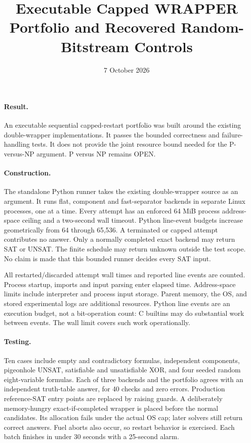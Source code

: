 \documentclass[11pt]{article}
\title{Executable Capped WRAPPER Portfolio and Recovered Random-Bitstream Controls}
\date{7 October 2026}
\begin{document}
\maketitle
\paragraph{Result.} An executable sequential capped-restart portfolio was built
around the existing double-wrapper implementations. It passes the bounded
correctness and failure-handling tests. It does not provide the joint resource
bound needed for the P-versus-NP argument. P versus NP remains OPEN.

\paragraph{Construction.} The standalone Python runner takes the existing
double-wrapper source as an argument. It runs flat, component and fast-separator
backends in separate Linux processes, one at a time. Every attempt has an enforced
64 MiB process address-space ceiling and a two-second wall timeout. Python
line-event budgets increase geometrically from 64 through 65,536. A terminated
or capped attempt contributes no answer. Only a normally completed exact backend
may return SAT or UNSAT. The finite schedule may return unknown outside the test
scope. No claim is made that this bounded runner decides every SAT input.

All restarted/discarded attempt wall times and reported line events are counted.
Process startup, imports and input parsing enter elapsed time. Address-space
limits include interpreter and process input storage. Parent memory, the OS,
and stored experimental logs are additional resources. Python line events are
an execution budget, not a bit-operation count: C builtins may do substantial
work between events. The wall limit covers such work operationally.

\paragraph{Testing.} Ten cases include empty and contradictory formulas,
independent components, pigeonhole UNSAT, satisfiable and unsatisfiable XOR,
and four seeded random eight-variable formulas. Each of three backends and the
portfolio agrees with an independent truth-table answer, for 40 checks and zero
errors. Production reference-SAT entry points are replaced by raising guards.
A deliberately memory-hungry exact-if-completed wrapper is placed before the
normal candidates. Its allocation fails under the actual OS cap; later solvers
still return correct answers. Fuel aborts also occur, so restart behavior is
exercised. Each batch finishes in under 30 seconds with a 25-second alarm.
\end{document}
